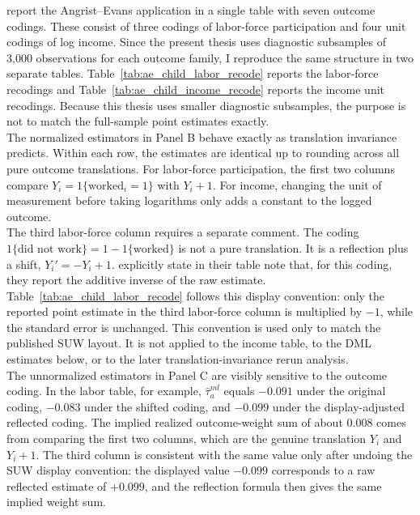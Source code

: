 \documentclass[12pt, a4paper, oneside]{article}
\theoremstyle{plain}
\theoremstyle{definition}
\begin{document}
\citet{sloczynski2025abadie} report the Angrist--Evans application in a single table with seven outcome codings. These consist of three codings of labor-force participation and four unit codings of log income. Since the present thesis uses diagnostic subsamples of 3{,}000 observations for each outcome family, I reproduce the same structure in two separate tables. Table~\ref{tab:ae_child_labor_recode} reports the labor-force recodings and Table~\ref{tab:ae_child_income_recode} reports the income unit recodings. 
Because this thesis uses smaller diagnostic subsamples, the purpose is not to match the full-sample point estimates exactly.\\
The normalized estimators in Panel B behave exactly as translation invariance predicts. Within each row, the estimates are identical up to rounding across all pure outcome translations. For labor-force participation, the first two columns compare \(Y_i=1\{\text{worked}_i=1\}\) with \(Y_i+1\). For income, changing the unit of measurement before taking logarithms only adds a constant to the logged outcome. \\
The third labor-force column requires a separate comment. The coding \(1\{\text{did not work}\}=1-1\{\text{worked}\}\) is not a pure translation. It is a reflection plus a shift, \(Y_i'=-Y_i+1\). \citet{sloczynski2025abadie} explicitly state in their table note that, for this coding, they report the additive inverse of the raw estimate. Table~\ref{tab:ae_child_labor_recode} follows this display convention: only the reported point estimate in the third labor-force column is multiplied by \(-1\), while the standard error is unchanged. This convention is used only to match the published SUW layout. It is not applied to the income table, to the DML estimates below, or to the later translation-invariance rerun analysis.\\
The unnormalized estimators in Panel C are visibly sensitive to the outcome coding. In the labor table, for example, \(\hat\tau_a^{ml}\) equals \(-0.091\) under the original coding, \(-0.083\) under the shifted coding, and \(-0.099\) under the display-adjusted reflected coding. The implied realized outcome-weight sum of about \(0.008\) comes from comparing the first two columns, which are the genuine translation \(Y_i\) and \(Y_i+1\). The third column is consistent with the same value only after undoing the SUW display convention: the displayed value \(-0.099\) corresponds to a raw reflected estimate of \(+0.099\), and the reflection formula then gives the same implied weight sum.\\
\end{document}

